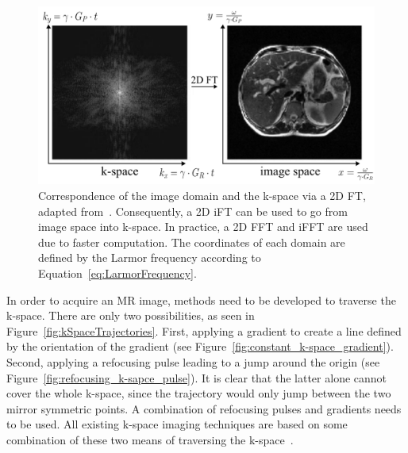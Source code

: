 \begin{figure}[h] %
	\centering
	\includegraphics[width=\linewidth]{./Images/2D_MRI_Measurement.png} 
	\caption{Correspondence of the image domain and the k-space via a 2D FT, adapted from~\cite{SamplingStrategies}. Consequently, a 2D iFT can be used to go from image space into k-space. In practice, a 2D FFT and iFFT are used due to faster computation. The coordinates of each domain are defined by the Larmor frequency according to Equation~\ref{eq:LarmorFrequency}.}
	\label{fig:2D_MRI_Measurement}
\end{figure}

\noindent In order to acquire an MR image, methods need to be developed to traverse the k-space. There are only two possibilities, as seen in Figure~\ref{fig:kSpaceTrajectories}. First, applying a gradient to create a line defined by the orientation of the gradient (see Figure~\ref{fig:constant_k-space_gradient}). 
Second, applying a refocusing pulse leading to a jump around the origin (see Figure~\ref{fig:refocusing_k-sapce_pulse}). It is clear that the latter alone cannot cover the whole k-space, since the trajectory would only jump between the two mirror symmetric points. A combination of refocusing pulses and gradients needs to be used. All existing k-space imaging techniques are based on some combination of these two means of traversing the k-space~\cite{SamplingStrategies}. 

